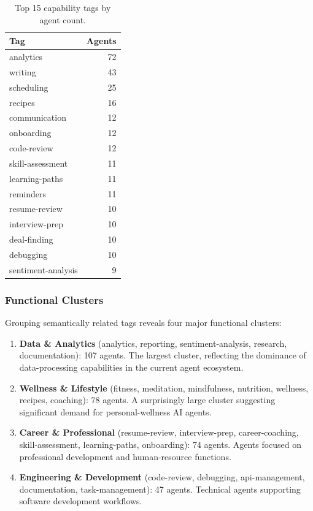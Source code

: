 \documentclass[11pt,twocolumn]{article}
\begin{document}
\begin{table}[t]
\centering
\caption{Top 15 capability tags by agent count.}
\label{tab:tags}
\begin{tabular}{@{}lr@{}}
\toprule
\textbf{Tag} & \textbf{Agents} \\
\midrule
analytics       & 72 \\
writing         & 43 \\
scheduling      & 25 \\
recipes         & 16 \\
communication   & 12 \\
onboarding      & 12 \\
code-review     & 12 \\
skill-assessment & 11 \\
learning-paths  & 11 \\
reminders       & 11 \\
resume-review   & 10 \\
interview-prep  & 10 \\
deal-finding    & 10 \\
debugging       & 10 \\
sentiment-analysis & 9 \\
\bottomrule
\end{tabular}
\end{table}

\subsubsection{Functional Clusters}

Grouping semantically related tags reveals four major functional clusters:

\begin{enumerate}[leftmargin=*,nosep]
    \item \textbf{Data \& Analytics} (analytics, reporting, sentiment-analysis, research, documentation): 107 agents. The largest cluster, reflecting the dominance of data-processing capabilities in the current agent ecosystem.

    \item \textbf{Wellness \& Lifestyle} (fitness, meditation, mindfulness, nutrition, wellness, recipes, coaching): 78 agents. A surprisingly large cluster suggesting significant demand for personal-wellness AI agents.

    \item \textbf{Career \& Professional} (resume-review, interview-prep, career-coaching, skill-assessment, learning-paths, onboarding): 74 agents. Agents focused on professional development and human-resource functions.

    \item \textbf{Engineering \& Development} (code-review, debugging, api-management, documentation, task-management): 47 agents. Technical agents supporting software development workflows.
\end{enumerate}
\end{document}
